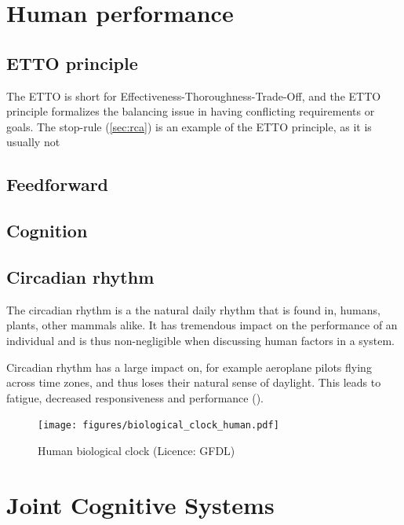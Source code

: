 \section{Human performance}

\subsection{ETTO principle}
The ETTO is short for Effectiveness-Thoroughness-Trade-Off, and the ETTO principle formalizes the balancing issue in having conflicting requirements or goals. The stop-rule (\ref{sec:rca}) is an example of the ETTO principle, as it is usually not 

\subsection{Feedforward}
\subsection{Cognition}

\subsection{Circadian rhythm}
The circadian rhythm is a the natural daily rhythm that is found in, humans, plants, other mammals alike. It has tremendous impact on the performance of an individual and is thus non-negligible when discussing human factors in a system.

Circadian rhythm has a large impact on, for example aeroplane pilots flying across time zones, and thus loses their natural sense of daylight. This leads to fatigue, decreased responsiveness and performance (\cite{mallis2010aircrew}).
\begin{figure}[h]
 \centering
   \texttt{[image: figures/biological\_clock\_human.pdf]}
 \caption{Human biological clock (Licence: GFDL)}
 \label{fig:human_biological_clock}
\end{figure}

\section{Joint Cognitive Systems}


